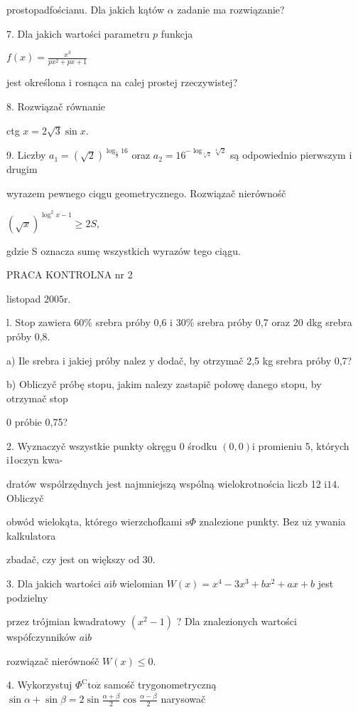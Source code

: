 \documentclass[a4paper,12pt]{article}
\begin{document}
prostopadfościanu. Dla jakich kątów $\alpha$ zadanie ma rozwiązanie?

7. Dla jakich wartości parametru $p$ funkcja

$f(x)=\displaystyle \frac{x^{3}}{px^{2}+px+1}$

jest określona $\mathrm{i}$ rosnąca na calej prostej rzeczywistej?

8. Rozwiązač równanie

ctg $x=2\sqrt{3}\sin x.$

9. Liczby $a_{1} = (\sqrt{2})^{\log_{\frac{1}{2}}16}$ oraz $a_{2} = 16^{-\log_{\sqrt[3]{2}}\sqrt[4]{2}}$ są odpowiednio pierwszym $\mathrm{i}$ drugim

wyrazem pewnego ciqgu geometrycznego. Rozwiązač nierównośč

$(\sqrt{x})^{\log^{2}x-1}\geq 2S,$

gdzie S oznacza sumę wszystkich wyrazów tego ciągu.




PRACA KONTROLNA nr 2

listopad $2005\mathrm{r}.$

l. Stop zawiera 60\% srebra próby 0,6 $\mathrm{i}$ 30\% srebra próby 0,7 oraz 20 dkg srebra próby 0,8.

a) Ile srebra $\mathrm{i}$ jakiej próby nalez $\mathrm{y}$ dodač, by otrzymač 2,5 kg srebra próby 0,7?

b) Obliczyč próbę stopu, jakim nalezy zastapič połowę danego stopu, by otrzymač stop

$0$ próbie 0,75?

2. Wyznaczyč wszystkie punkty okręgu $0$ środku $(0,0)\mathrm{i}$ promieniu 5, których i1oczyn kwa-

dratów wspólrzędnych jest najmniejszą wspólną wielokrotnościa liczb 12 $\mathrm{i} 14$. Obliczyč

obwód wielokąta, którego wierzchofkami $\mathrm{s}\Phi$ znalezione punkty. Bez $\mathrm{u}\dot{\mathrm{z}}$ ywania kalkulatora

zbadač, czy jest on większy od 30.

3. Dla jakich wartości $a \mathrm{i} b$ wielomian $W(x) = x^{4}-3x^{3}+bx^{2}+ax+b$ jest podzielny

przez trójmian kwadratowy $(x^{2}-1)$ ? Dla znalezionych wartości wspófczynników $a\mathrm{i}b$

rozwiązač nierównośč $W(x)\leq 0.$

4. Wykorzystuj $\Phi^{\mathrm{C}}\mathrm{t}\mathrm{o}\dot{\mathrm{z}}$ samośč trygonometryczną $\displaystyle \sin\alpha+\sin\beta=2\sin\frac{\alpha+\beta}{2}\cos\frac{\alpha-\beta}{2}$ narysowač
\end{document}
